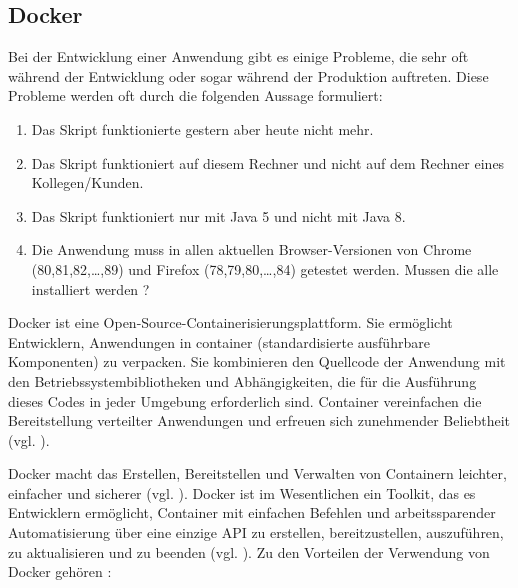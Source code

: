 \subsection{Docker}

Bei der Entwicklung einer Anwendung gibt es einige Probleme, die
sehr oft während der Entwicklung oder sogar während der Produktion
auftreten. Diese Probleme werden oft durch die folgenden Aussage
formuliert:

\begin{enumerate}
    \item Das Skript funktionierte gestern aber heute nicht mehr.
    \item Das Skript funktioniert auf diesem Rechner und nicht auf
    dem Rechner eines Kollegen/Kunden.
    \item Das Skript funktioniert nur mit Java 5 und nicht mit Java 8.
    \item Die Anwendung muss in allen aktuellen Browser-Versionen von Chrome (80,81,82,\ldots,89) und Firefox (78,79,80,\ldots,84) getestet werden.
    Mussen die alle installiert werden ?
\end{enumerate}

Docker ist eine Open-Source-Containerisierungsplattform. Sie
ermöglicht Entwicklern, Anwendungen in \Gls{container}
(standardisierte ausführbare Komponenten) zu verpacken.
Sie kombinieren den Quellcode der Anwendung mit den
Betriebssystembibliotheken und Abhängigkeiten, die für die
Ausführung dieses Codes in jeder Umgebung erforderlich sind.
Container vereinfachen die Bereitstellung verteilter Anwendungen und
erfreuen sich zunehmender Beliebtheit (vgl. \cite{docker}).

Docker macht das Erstellen, Bereitstellen und Verwalten von
Containern leichter, einfacher und sicherer (vgl. \cite{ibm-docker}).
Docker ist im Wesentlichen ein Toolkit, das es Entwicklern ermöglicht,
Container mit einfachen Befehlen und arbeitssparender Automatisierung
über eine einzige API zu erstellen, bereitzustellen, auszuführen,
zu aktualisieren und zu beenden (vgl. \cite{ibm-docker}). Zu den Vorteilen der Verwendung von
Docker gehören :

